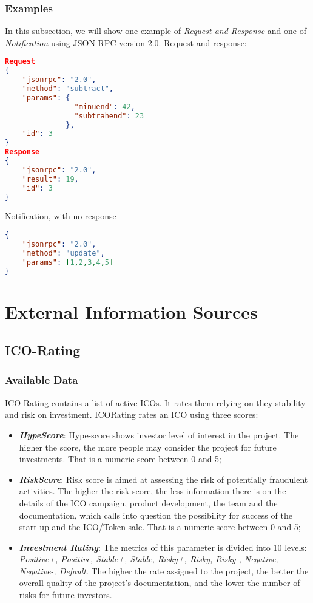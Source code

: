 \subsubsection{Examples}
In this subsection, we will show one example of \textit{Request and Response} and one of \textit{Notification} using JSON-RPC version 2.0.
\newline
Request and response:
\begin{lstlisting}[language=json]
Request
{
    "jsonrpc": "2.0", 
    "method": "subtract", 
    "params": {
                "minuend": 42, 
                "subtrahend": 23
              },
    "id": 3
}
Response 
{
    "jsonrpc": "2.0", 
    "result": 19, 
    "id": 3
}
\end{lstlisting}
Notification, with no response
\begin{lstlisting}[language=json]
{
    "jsonrpc": "2.0",
    "method": "update",
    "params": [1,2,3,4,5]
}
\end{lstlisting}

\section{External Information Sources}
\label{informationsources}
\subsection{ICO-Rating}
\label{icoRating}
\subsubsection{Available Data}
\label{icoRatingAvailableData}
\href{https://icorating.com/}{ICO-Rating} contains a list of active ICOs. It rates them relying on they stability and risk on investment. ICORating rates an ICO using three scores:
\begin{itemize}
    \item \textit{\textbf{HypeScore}}: Hype-score shows investor level of interest in the project. The higher the score, the more people may consider the project for future investments. That is a numeric score between 0 and 5;
    \item \textit{\textbf{RiskScore}}: Risk score is aimed at assessing the risk of potentially fraudulent activities. The higher the risk score, the less information there is on the details of the ICO campaign, product development, the team and the documentation, which calls into question the possibility for success of the start-up and the ICO/Token sale. That is a numeric score between 0 and 5;
    \item \textit{\textbf{Investment Rating}}: The metrics of this parameter is divided into 10 levels: \textit{Positive+, Positive, Stable+, Stable, Risky+, Risky, Risky-, Negative, Negative-, Default}. The higher the rate assigned to the project, the better the overall quality of the project’s documentation, and the lower the number of risks for future investors.
\end{itemize}
